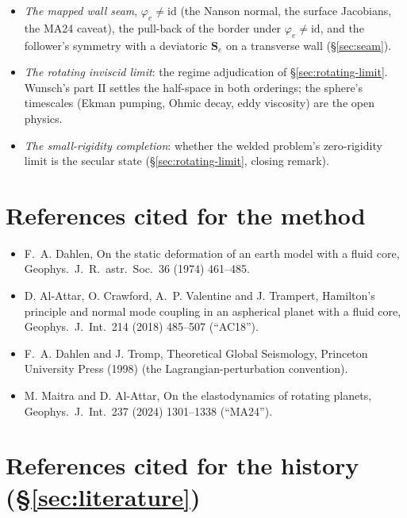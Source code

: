 \documentclass[11pt]{article}
\theoremstyle{definition}
\theoremstyle{remark}
\newcommand{\Se}{\mathbf{S}_e}
\begin{document}
\begin{itemize}
\item \emph{The mapped wall seam}, $\varphi_e \ne \mathrm{id}$ (the
  Nanson normal, the surface Jacobians, the MA24 caveat), the pull-back
  of the border under $\varphi_e \ne \mathrm{id}$, and the follower's
  symmetry with a deviatoric $\Se$ on a transverse wall
  (\S\ref{sec:seam}).
\item \emph{The rotating inviscid limit}: the regime adjudication of
  \S\ref{sec:rotating-limit}. Wunsch's part II settles the half-space in
  both orderings; the sphere's timescales (Ekman pumping, Ohmic decay,
  eddy viscosity) are the open physics.
\item \emph{The small-rigidity completion}: whether the welded problem's
  zero-rigidity limit is the secular state (\S\ref{sec:rotating-limit},
  closing remark).
\end{itemize}

\section*{References cited for the method}

\begin{itemize}\small
\item F.~A. Dahlen, On the static deformation of an earth model with a
  fluid core, Geophys.\ J.\ R.\ astr.\ Soc.\ 36 (1974) 461--485.
\item D. Al-Attar, O. Crawford, A.~P. Valentine and J. Trampert,
  Hamilton's principle and normal mode coupling in an aspherical planet
  with a fluid core, Geophys.\ J.\ Int.\ 214 (2018) 485--507 (``AC18'').
\item F.~A. Dahlen and J. Tromp, Theoretical Global Seismology,
  Princeton University Press (1998) (the Lagrangian-perturbation
  convention).
\item M. Maitra and D. Al-Attar, On the elastodynamics of rotating
  planets, Geophys.\ J.\ Int.\ 237 (2024) 1301--1338 (``MA24'').
\end{itemize}

\section*{References cited for the history (\S\ref{sec:literature})}
\end{document}
